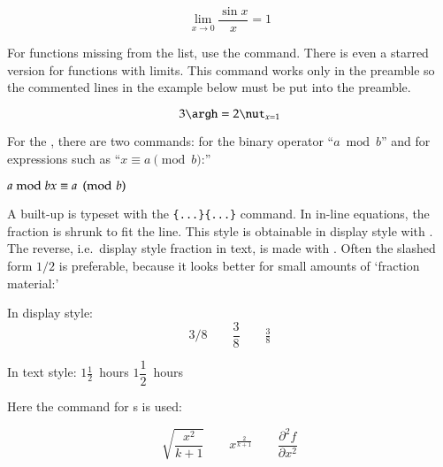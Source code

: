 \begin{example}
\begin{equation*}
  \lim_{x \rightarrow 0}
  \frac{\sin x}{x}=1
\end{equation*}
\end{example}

For functions missing from the list, use the 
command. There is even a starred version for functions with limits.
This command works only in the preamble so the commented lines in the
example below must be put into the preamble.

\begin{example}
\begin{equation*}
  3\argh = 2\nut_{x=1}    
\end{equation*}
\end{example}

For the , there are two commands:  for the
binary operator ``$a \bmod b$'' and 
for expressions
such as ``$x\equiv a \pmod{b}$:''
\begin{example}
$a\bmod b \\
 x\equiv a \pmod{b}$
\end{example}

A built-up \textbf{} is typeset with the
\verb|{...}{...}| command. In in-line equations, the fraction is shrunk to
fit the line. This style is obtainable in display style with . The
reverse, i.e.\ display style fraction in text, is made with .
Often the slashed form $1/2$ is preferable, because it looks better
for small amounts of `fraction material:'
\begin{example}
In display style:
\begin{equation*}
  3/8 \qquad \frac{3}{8} 
  \qquad \tfrac{3}{8}
\end{equation*}
\end{example}

\begin{example}
In text style:
$1\frac{1}{2}$~hours \qquad
$1\dfrac{1}{2}$~hours
\end{example}
 
Here the  command for s is used:
\begin{example}
\begin{equation*} 
  \sqrt{\frac{x^2}{k+1}}\qquad
  x^\frac{2}{k+1}\qquad
  \frac{\partial^2f}
  {\partial x^2} 
\end{equation*}
\end{example}

